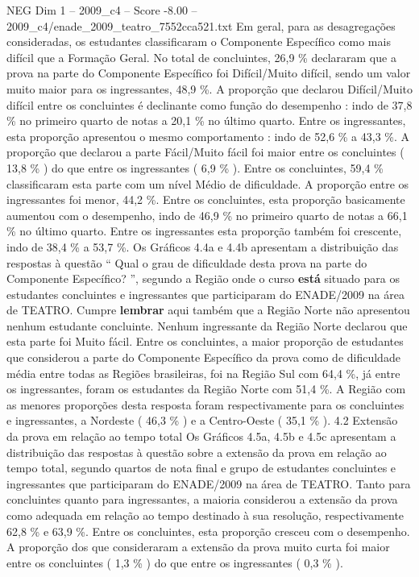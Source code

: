 \begin{textsample}{NEG Dim 1 – 2009\_c4 – Score -8.00 – 2009\_c4/enade\_2009\_teatro\_7552cca521.txt}
Em geral, para as desagregações consideradas, os estudantes classificaram o Componente Específico como mais difícil que a Formação Geral.
No total de concluintes, 26,9 \% declararam que a prova na parte do Componente Específico foi Difícil/Muito difícil, sendo um valor muito maior para os ingressantes, 48,9 \%.
A proporção que declarou Difícil/Muito difícil entre os concluintes é declinante como função do desempenho : indo de 37,8 \% no primeiro quarto de notas a 20,1 \% no último quarto.
Entre os ingressantes, esta proporção apresentou o mesmo comportamento : indo de 52,6 \% a 43,3 \%.
A proporção que declarou a parte Fácil/Muito fácil foi maior entre os concluintes ( 13,8 \% ) do que entre os ingressantes ( 6,9 \% ).
Entre os concluintes, 59,4 \% classificaram esta parte com um nível Médio de dificuldade.
A proporção entre os ingressantes foi menor, 44,2 \%.
Entre os concluintes, esta proporção basicamente aumentou com o desempenho, indo de 46,9 \% no primeiro quarto de notas a 66,1 \% no último quarto.
Entre os ingressantes esta proporção também foi crescente, indo de 38,4 \% a 53,7 \%.
Os Gráficos 4.4a e 4.4b apresentam a distribuição das respostas à questão “ Qual o grau de dificuldade desta prova na parte do Componente Específico? ”, segundo a Região onde o curso \textbf{está} situado para os estudantes concluintes e ingressantes que participaram do ENADE/2009 na área de TEATRO.
Cumpre \textbf{lembrar} aqui também que a Região Norte não apresentou nenhum estudante concluinte.
Nenhum ingressante da Região Norte declarou que esta parte foi Muito fácil.
Entre os concluintes, a maior proporção de estudantes que considerou a parte do Componente Específico da prova como de dificuldade média entre todas as Regiões brasileiras, foi na Região Sul com 64,4 \%, já entre os ingressantes, foram os estudantes da Região Norte com 51,4 \%.
A Região com as menores proporções desta resposta foram respectivamente para os concluintes e ingressantes, a Nordeste ( 46,3 \% ) e a Centro-Oeste ( 35,1 \% ). 4.2 Extensão da prova em relação ao tempo total Os Gráficos 4.5a, 4.5b e 4.5c apresentam a distribuição das respostas à questão sobre a extensão da prova em relação ao tempo total, segundo quartos de nota final e grupo de estudantes concluintes e ingressantes que participaram do ENADE/2009 na área de TEATRO.
Tanto para concluintes quanto para ingressantes, a maioria considerou a extensão da prova como adequada em relação ao tempo destinado à sua resolução, respectivamente 62,8 \% e 63,9 \%.
Entre os concluintes, esta proporção cresceu com o desempenho.
A proporção dos que consideraram a extensão da prova muito curta foi maior entre os concluintes ( 1,3 \% ) do que entre os ingressantes ( 0,3 \% ).

\end{textsample}
